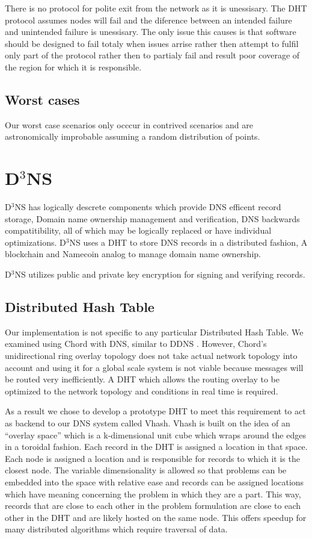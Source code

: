 \documentclass[11pt]{IEEEtran} %
\begin{document}
There is no protocol for polite exit from the network as it is unessisary. The DHT protocol assumes nodes will fail and the diference between an intended failure and unintended failure is unessisary. The only issue this causes is that software should be designed to fail totaly when issues arrise rather then attempt to fulfil only part of the protocol rather then to partialy fail and result poor coverage of the region for which it is responsible.

\subsection{Worst cases}

Our worst case scenarios only occcur in contrived scenarios and are astronomically improbable assuming a random distribution of points.

\section{D$^{3}$NS}
D$^{3}$NS has logically descrete components which provide DNS efficent record storage, Domain name ownership management and verification, DNS backwards compatitibility, all of which may be logically replaced or have individual optimizations. D$^{3}$NS uses a DHT to store DNS records in a distributed fashion, A blockchain and Namecoin\cite{namecoin} analog to manage domain name ownership.

D$^{3}$NS utilizes public and private key encryption for signing and verifying records.


\subsection{Distributed Hash Table}
Our implementation is not specific to any particular Distributed Hash Table.  We examined using Chord \cite{chord} with DNS, similar to DDNS \cite{cox}.  However, Chord’s unidirectional ring overlay topology does not take actual network topology into account and using it for a global scale system is not viable because messages will be routed very inefficiently. A DHT which allows the routing overlay to be optimized to the network topology and conditions in real time is required.

As a result we chose to develop a prototype DHT to meet this requirement to act as backend to our DNS system called Vhash. Vhash is built on the idea of an “overlay space” which is a k-dimensional unit cube which wraps around the edges in a toroidal fashion. Each record in the DHT is assigned a location in that space. Each node is assigned a location and is responsible for records to which it is the closest node. The variable dimensionality is allowed so that problems can be embedded into the space with relative ease and records can be assigned locations which have meaning concerning the problem in which they are a part. This way, records that are close to each other in the problem formulation are close to each other in the DHT and are likely hosted on the same node. This offers speedup for many distributed algorithms which require traversal of data.
\end{document}
